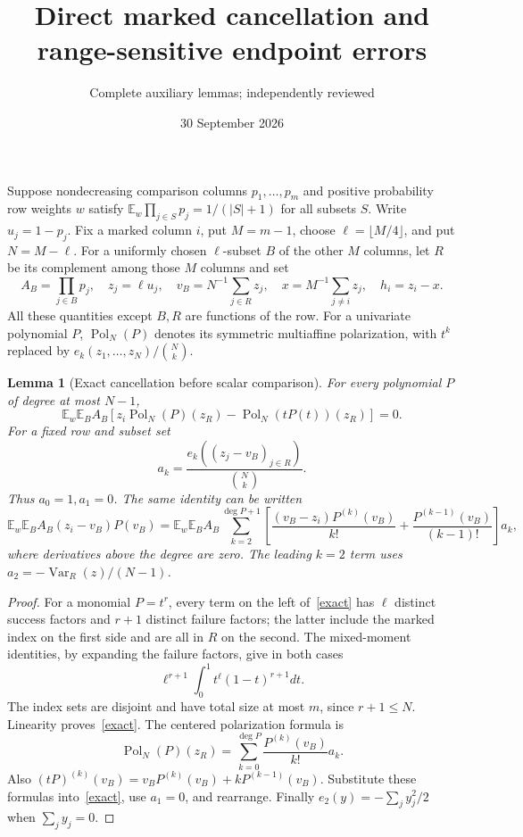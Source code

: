 \documentclass[11pt]{article}
\title{Direct marked cancellation and range-sensitive endpoint errors}
\author{Complete auxiliary lemmas; independently reviewed}\date{30 September 2026}
\newtheorem{lemma}{Lemma}\newtheorem{theorem}{Theorem}
\newcommand{\E}{\mathbb E}\newcommand{\Pol}{\operatorname{Pol}}
\begin{document}
\maketitle
Suppose nondecreasing comparison columns $p_1,\ldots,p_m$ and positive
probability row weights $w$ satisfy
$\E_w\prod_{j\in S}p_j=1/(|S|+1)$ for all subsets $S$.
Write $u_j=1-p_j$. Fix a marked column $i$, put $M=m-1$, choose
$\ell=\lfloor M/4\rfloor$, and put $N=M-\ell$.
For a uniformly chosen $\ell$-subset $B$ of the other $M$ columns,
let $R$ be its complement among those $M$ columns and set
\[
 A_B=\prod_{j\in B}p_j,\quad z_j=\ell u_j,\quad
 v_B=N^{-1}\sum_{j\in R}z_j,\quad
 x=M^{-1}\sum_{j\ne i}z_j,\quad h_i=z_i-x.
\]
All these quantities except $B,R$ are functions of the row.
For a univariate polynomial $P$, $\Pol_N(P)$ denotes its symmetric
multiaffine polarization, with $t^k$ replaced by
$e_k(z_1,\ldots,z_N)/\binom Nk$.

\begin{lemma}[Exact cancellation before scalar comparison]\label{identity}
For every polynomial $P$ of degree at most $N-1$,
\begin{equation}\label{exact}
 \E_w\E_B A_B\left[
 z_i\Pol_N(P)(z_R)-\Pol_N(tP(t))(z_R)\right]=0.
\end{equation}
For a fixed row and subset set
\[
 a_k=\frac{e_k((z_j-v_B)_{j\in R})}{\binom Nk}.
\]
Thus $a_0=1,a_1=0$. The same identity can be written
\begin{equation}\label{expanded}
 \E_w\E_B A_B(z_i-v_B)P(v_B)
 =\E_w\E_B A_B\sum_{k=2}^{\deg P+1}
 \left[\frac{(v_B-z_i)P^{(k)}(v_B)}{k!}
       +\frac{P^{(k-1)}(v_B)}{(k-1)!}\right]a_k,
\end{equation}
where derivatives above the degree are zero. The leading $k=2$ term
uses $a_2=-\operatorname{Var}_R(z)/(N-1)$.
\end{lemma}
\begin{proof}
For a monomial $P=t^r$, every term on the left of~\eqref{exact}
has $\ell$ distinct success factors and $r+1$ distinct failure
factors; the latter include the marked index on the first side and
are all in $R$ on the second. The mixed-moment identities, by expanding
the failure factors, give in both cases
\[
 \ell^{r+1}\int_0^1 t^\ell(1-t)^{r+1}dt.
\]
The index sets are disjoint and have total size at most $m$, since
$r+1\le N$. Linearity proves~\eqref{exact}.
The centered polarization formula is
\[
 \Pol_N(P)(z_R)=\sum_{k=0}^{\deg P}
                    \frac{P^{(k)}(v_B)}{k!}a_k.
\]
Also $(tP)^{(k)}(v_B)=v_BP^{(k)}(v_B)+kP^{(k-1)}(v_B)$.
Substitute these formulas into~\eqref{exact}, use $a_1=0$, and
rearrange. Finally $e_2(y)=-\sum_jy_j^2/2$ when $\sum_jy_j=0$.
\end{proof}
\end{document}
